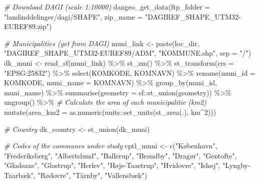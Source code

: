 \documentclass[
  12pt,
]{article}
\newenvironment{Shaded}{\begin{snugshade}}{\end{snugshade}}
\newcommand{\AttributeTok}[1]{\textcolor[rgb]{0.77,0.63,0.00}{#1}}
\newcommand{\CommentTok}[1]{\textcolor[rgb]{0.56,0.35,0.01}{\textit{#1}}}
\newcommand{\DecValTok}[1]{\textcolor[rgb]{0.00,0.00,0.81}{#1}}
\newcommand{\FunctionTok}[1]{\textcolor[rgb]{0.00,0.00,0.00}{#1}}
\newcommand{\NormalTok}[1]{#1}
\newcommand{\OtherTok}[1]{\textcolor[rgb]{0.56,0.35,0.01}{#1}}
\newcommand{\SpecialCharTok}[1]{\textcolor[rgb]{0.00,0.00,0.00}{#1}}
\newcommand{\StringTok}[1]{\textcolor[rgb]{0.31,0.60,0.02}{#1}}
\begin{document}
\begin{Shaded}
\begin{Highlighting}[]
\CommentTok{\# Download DAGI (scale 1:10000)}
\FunctionTok{dangeo\_get\_data}\NormalTok{(}\AttributeTok{ftp\_folder =} \StringTok{"landinddelinger/dagi/SHAPE"}\NormalTok{,}
                \AttributeTok{zip\_name   =} \StringTok{"DAGIREF\_SHAPE\_UTM32{-}EUREF89.zip"}\NormalTok{)}

\CommentTok{\# Municipalities (get from DAGI)}
\NormalTok{muni\_link }\OtherTok{\textless{}{-}} \FunctionTok{paste}\NormalTok{(loc\_dir,}
                   \StringTok{"DAGIREF\_SHAPE\_UTM32{-}EUREF89/ADM"}\NormalTok{,}
                   \StringTok{"KOMMUNE.shp"}\NormalTok{,}
                   \AttributeTok{sep =} \StringTok{"/"}\NormalTok{)}
\NormalTok{dk\_muni  }\OtherTok{\textless{}{-}} \FunctionTok{read\_sf}\NormalTok{(muni\_link) }\SpecialCharTok{\%\textgreater{}\%}
  \FunctionTok{st\_zm}\NormalTok{() }\SpecialCharTok{\%\textgreater{}\%} 
  \FunctionTok{st\_transform}\NormalTok{(}\AttributeTok{crs =} \StringTok{"EPSG:25832"}\NormalTok{) }\SpecialCharTok{\%\textgreater{}\%} 
  \FunctionTok{select}\NormalTok{(KOMKODE, KOMNAVN) }\SpecialCharTok{\%\textgreater{}\%} 
  \FunctionTok{rename}\NormalTok{(}\AttributeTok{muni\_id =}\NormalTok{ KOMKODE,}
         \AttributeTok{muni\_name =}\NormalTok{ KOMNAVN) }\SpecialCharTok{\%\textgreater{}\%} 
  \FunctionTok{group\_by}\NormalTok{(muni\_id, muni\_name) }\SpecialCharTok{\%\textgreater{}\%}
  \FunctionTok{summarise}\NormalTok{(}\AttributeTok{geometry =}\NormalTok{ sf}\SpecialCharTok{::}\FunctionTok{st\_union}\NormalTok{(geometry)) }\SpecialCharTok{\%\textgreater{}\%}
  \FunctionTok{ungroup}\NormalTok{() }\SpecialCharTok{\%\textgreater{}\%} 
  \CommentTok{\# Calculate the area of each municipalitie (km2) }
  \FunctionTok{mutate}\NormalTok{(}\AttributeTok{area\_km2 =} \FunctionTok{as.numeric}\NormalTok{(units}\SpecialCharTok{::}\FunctionTok{set\_units}\NormalTok{(}\FunctionTok{st\_area}\NormalTok{(.), km}\SpecialCharTok{\^{}}\DecValTok{2}\NormalTok{))) }

\CommentTok{\# Country}
\NormalTok{dk\_country }\OtherTok{\textless{}{-}} \FunctionTok{st\_union}\NormalTok{(dk\_muni)}

\CommentTok{\# Codes of the communes under study}
\NormalTok{cptl\_muni }\OtherTok{\textless{}{-}} \FunctionTok{c}\NormalTok{(}\StringTok{"København"}\NormalTok{,}
               \StringTok{"Frederiksberg"}\NormalTok{,}
               \StringTok{"Albertslund"}\NormalTok{,}
               \StringTok{"Ballerup"}\NormalTok{,}
               \StringTok{"Brøndby"}\NormalTok{,}
               \StringTok{"Dragør"}\NormalTok{,}
               \StringTok{"Gentofte"}\NormalTok{,}
               \StringTok{"Gladsaxe"}\NormalTok{,}
               \StringTok{"Glostrup"}\NormalTok{,}
               \StringTok{"Herlev"}\NormalTok{,}
               \StringTok{"Høje{-}Taastrup"}\NormalTok{,}
               \StringTok{"Hvidovre"}\NormalTok{,}
               \StringTok{"Ishøj"}\NormalTok{,}
               \StringTok{"Lyngby{-}Taarbæk"}\NormalTok{,}
               \StringTok{"Rødovre"}\NormalTok{,}
               \StringTok{"Tårnby"}\NormalTok{,}
               \StringTok{"Vallensbæk"}\NormalTok{)}


\end{Highlighting}
\end{Shaded}
\end{document}
